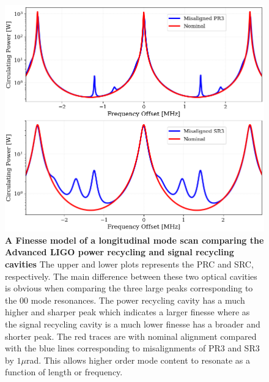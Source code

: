 		\begin{figure}[ht]
			\centering
			\includegraphics[width=0.55 \textwidth]{../Figures/PRC_SRC_ModeScan.png}
			\caption[A Finesse model of a longitudinal mode scan comparing the Advanced LIGO power recycling and signal recycling cavities.]
			{\textbf{A Finesse model of a longitudinal mode scan comparing the Advanced LIGO power recycling and signal recycling cavities}	The upper and lower plots represents the PRC and SRC, respectively.  The main difference between these two optical cavities is obvious when comparing the three large peaks corresponding to the 00 mode resonances.  The power recycling cavity has a much higher and sharper peak which indicates a larger finesse where as the signal recycling cavity is a much lower finesse has a broader and shorter peak.  The red traces are with nominal alignment compared with the blue lines corresponding to misalignments of PR3 and SR3 by $1 \mu$rad.  This allows higher order mode content to resonate as a function of length or frequency.}
			\label{fig:PRC_SRC_mode_scan}
		\end{figure}
